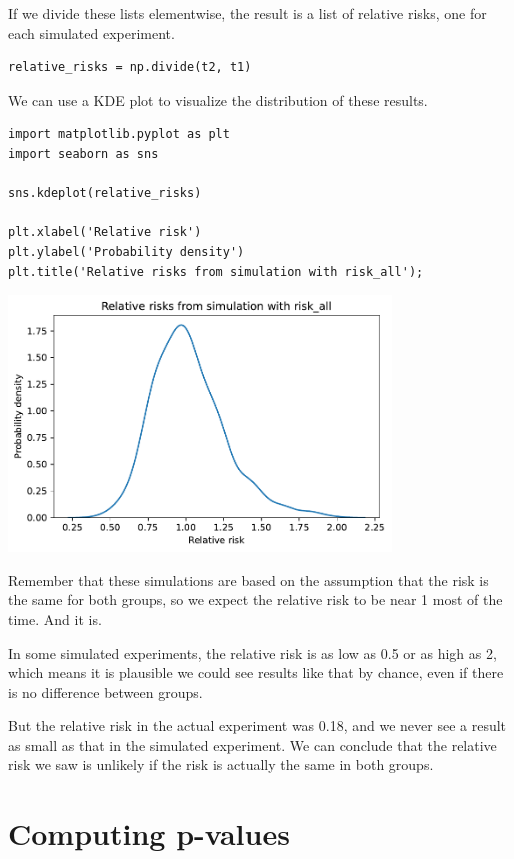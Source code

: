 If we divide these lists elementwise, the result is a list of relative
risks, one for each simulated experiment.

\begin{lstlisting}[]
relative_risks = np.divide(t2, t1)
\end{lstlisting}

We can use a KDE plot to visualize the distribution of these results.

\begin{lstlisting}[]
import matplotlib.pyplot as plt
import seaborn as sns

sns.kdeplot(relative_risks)

plt.xlabel('Relative risk')
plt.ylabel('Probability density')
plt.title('Relative risks from simulation with risk_all');
\end{lstlisting}

\begin{center}
\includegraphics[width=4in]{chapters/13_hypothesis_files/13_hypothesis_27_0.pdf}
\end{center}

Remember that these simulations are based on the assumption that the
risk is the same for both groups, so we expect the relative risk to be
near 1 most of the time. And it is.

In some simulated experiments, the relative risk is as low as 0.5 or as
high as 2, which means it is plausible we could see results like that by
chance, even if there is no difference between groups.

But the relative risk in the actual experiment was 0.18, and we never
see a result as small as that in the simulated experiment. We can
conclude that the relative risk we saw is unlikely if the risk is
actually the same in both groups.

\hypertarget{computing-p-values}{%
\section{Computing p-values}\label{computing-p-values}}

